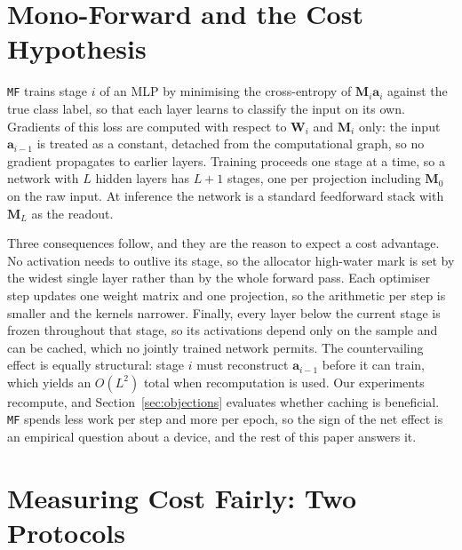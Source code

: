 \documentclass{llncs}
\newcommand{\MF}{\texttt{MF}}
\begin{document}
\section{Mono-Forward and the Cost Hypothesis}
\label{sec:mf}

\MF{} trains stage $i$ of an MLP by minimising the cross-entropy of $\mathbf{M}_i \mathbf{a}_i$ against the
true class label, so that each layer learns to classify the input on its own. Gradients of this loss
are computed with respect to $\mathbf{W}_i$ and $\mathbf{M}_i$ only: the input
$\mathbf{a}_{i-1}$ is treated as a constant, detached from the computational
graph, so no gradient propagates to earlier layers. Training proceeds one
stage at a time, so a network with $L$ hidden layers has $L+1$ stages, one per
projection including $\mathbf{M}_0$ on the raw input. At inference the network
is a standard feedforward stack with $\mathbf{M}_L$ as the readout.

Three consequences follow, and they are the reason to expect a cost advantage.
No activation needs to outlive its stage, so the allocator high-water mark is
set by the widest single layer rather than by the whole forward pass. Each
optimiser step updates one weight matrix and one projection, so the arithmetic
per step is smaller and the kernels narrower. Finally, every layer below the
current stage is frozen throughout that stage, so its activations depend only
on the sample and can be cached, which no jointly trained network permits.
The countervailing effect is equally structural: stage $i$ must reconstruct
$\mathbf{a}_{i-1}$ before it can train, which yields an $O(L^2)$ total when
recomputation is used. Our experiments recompute, and
Section~\ref{sec:objections} evaluates whether caching is beneficial. \MF{}
spends less work per step and more per epoch, so the sign of the net
effect is an empirical question about a device, and the rest of this paper answers it.


\section{Measuring Cost Fairly: Two Protocols}
\label{sec:protocols}
\end{document}

